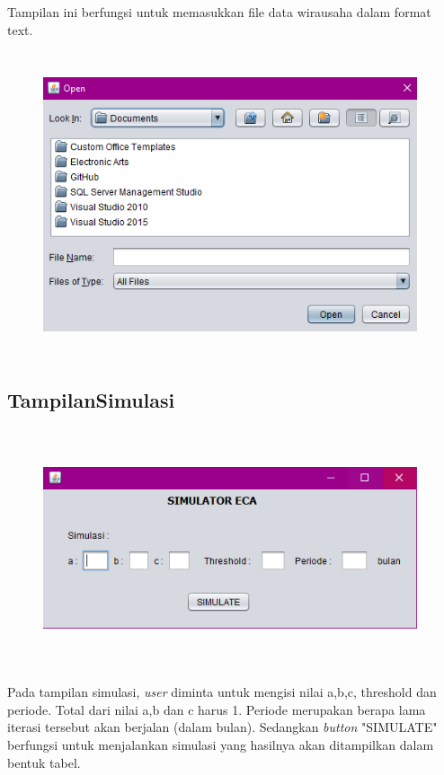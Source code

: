 Tampilan ini berfungsi untuk memasukkan file data wirausaha dalam format text.


\begin{figure} [H]
	\centering  
	\includegraphics[width=11cm, height=9cm]{tampilanBukaFile} 
	\label{fig:bukaFile} 
\end{figure}



\subsection{TampilanSimulasi}

\begin{figure} [H]
	\centering  
	\includegraphics[width=11cm, height=7cm]{tampilanSimulasii} 
	\label{fig:simulasi} 
\end{figure}

Pada tampilan simulasi, \textit{user} diminta untuk mengisi nilai a,b,c, threshold dan periode. Total dari nilai a,b dan c harus 1. Periode merupakan berapa lama iterasi tersebut akan berjalan (dalam bulan). Sedangkan \textit{button} "SIMULATE" berfungsi untuk menjalankan simulasi yang hasilnya akan ditampilkan dalam bentuk tabel.

